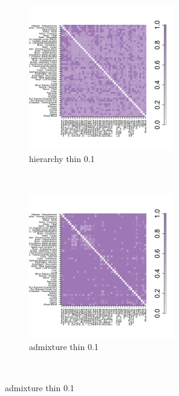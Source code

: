   \begin{figure}[ht]
    \centering
    \begin{subfigure}[t]{0.5\textwidth}
        \centering
        \includegraphics[height=2.5in]{../plots/hierarchy_F_thin_0_1.png}
        \caption{hierarchy thin 0.1}
    \end{subfigure}%
    ~ 
    \begin{subfigure}[t]{0.5\textwidth}
        \centering
        \includegraphics[height=2.5in]{../plots/admixture_F_thin_0_1.png}
        \caption{admixture thin 0.1}
    \end{subfigure} \\
    

\end{figure}
